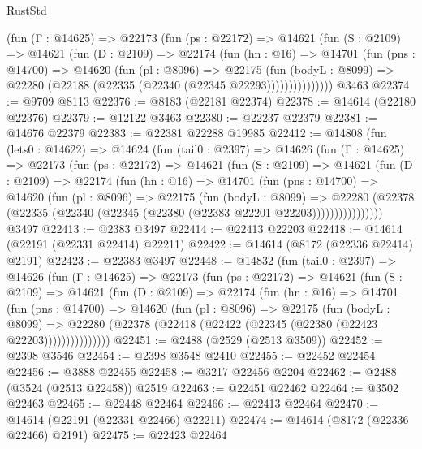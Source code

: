 \begin{lexlean}{RustStd}
\begin{coremodule}
          (fun (Γ : @14625) =>
          @22173
            (fun (ps : @22172) =>
            @14621
              (fun (S : @2109) =>
              @14621
                (fun (D : @2109) =>
                @22174
                  (fun (hn : @16) =>
                  @14701
                    (fun (pns : @14700) =>
                    @14620
                      (fun (pl : @8096) =>
                      @22175
                        (fun (bodyL : @8099) =>
                        @22280 (@22188 (@22335 (@22340 (@22345 @22293)))))))))))))))
    @3463
@22374 := @9709 @8113
@22376 := @8183 (@22181 @22374)
@22378 := @14614 (@22180 @22376)
@22379 := @12122 @3463
@22380 := @22237 @22379
@22381 := @14676 @22379
@22383 := @22381 @22288 @19985
@22412 := @14808
    (fun (lets0 : @14622) =>
    @14624
      (fun (tail0 : @2397) =>
      @14626
        (fun (Γ : @14625) =>
        @22173
          (fun (ps : @22172) =>
          @14621
            (fun (S : @2109) =>
            @14621
              (fun (D : @2109) =>
              @22174
                (fun (hn : @16) =>
                @14701
                  (fun (pns : @14700) =>
                  @14620
                    (fun (pl : @8096) =>
                    @22175
                      (fun (bodyL : @8099) =>
                      @22280
                        (@22378
                          (@22335 (@22340 (@22345 (@22380 (@22383 @22201 @22203))))))))))))))))
    @3497
@22413 := @2383 @3497
@22414 := @22413 @22203
@22418 := @14614 (@22191 (@22331 @22414) @22211)
@22422 := @14614 (@8172 (@22336 @22414) @2191)
@22423 := @22383 @3497
@22448 := @14832
    (fun (tail0 : @2397) =>
    @14626
      (fun (Γ : @14625) =>
      @22173
        (fun (ps : @22172) =>
        @14621
          (fun (S : @2109) =>
          @14621
            (fun (D : @2109) =>
            @22174
              (fun (hn : @16) =>
              @14701
                (fun (pns : @14700) =>
                @14620
                  (fun (pl : @8096) =>
                  @22175
                    (fun (bodyL : @8099) =>
                    @22280 (@22378 (@22418 (@22422 (@22345 (@22380 (@22423 @22203)))))))))))))))
@22451 := @2488 (@2529 (@2513 @3509))
@22452 := @2398 @3546
@22454 := @2398 @3548 @2410
@22455 := @22452 @22454
@22456 := @3888 @22455
@22458 := @3217 @22456 @2204
@22462 := @2488 (@3524 (@2513 @22458)) @2519
@22463 := @22451 @22462
@22464 := @3502 @22463
@22465 := @22448 @22464
@22466 := @22413 @22464
@22470 := @14614 (@22191 (@22331 @22466) @22211)
@22474 := @14614 (@8172 (@22336 @22466) @2191)
@22475 := @22423 @22464

\end{coremodule}
\end{lexlean}
